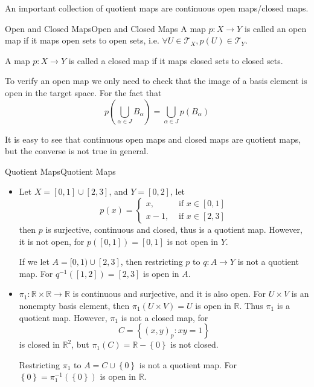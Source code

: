 \documentclass[../main.tex]{subfiles}
\begin{document}
An important collection of quotient maps are continuous open maps/closed maps.
\begin{definition}{Open and Closed Maps}{Open and Closed Maps}
A map $p: X \rightarrow Y$ is called an open map if it maps open sets to open sets, i.e. $\forall U\in \mathcal{T}_X, p(U) \in \mathcal{T}_Y$.

A map $p: X \rightarrow Y$ is called a closed map if it maps closed sets to closed sets.
\end{definition}

\begin{remark}
To verify an open map we only need to check that the image of a basis element is open in the target space. For the fact that
\begin{equation*}
p(\bigcup_{\alpha\in J} B_{\alpha}) = \bigcup_{\alpha\in J} p(B_{\alpha})
\end{equation*}
\end{remark}

It is easy to see that continuous open maps and closed maps are quotient maps, but the converse is not true in general.

\begin{example}{Quotient Maps}{Quotient Maps}
\begin{itemize}
\item Let $X = [0,1]\cup [2,3]$, and $Y = [0,2]$, let
\begin{equation*}
p(x) = 
\begin{cases}
	x, &\text{ if } x\in [0,1] \\
	x-1, &\text{ if } x\in [2,3]
\end{cases}
\end{equation*}
then $p$ is surjective, continuous and closed, thus is a quotient map. However, it is not open, for $p([0,1]) = [0,1]$ is not open in $Y$.

If we let $A = [0,1)\cup [2,3]$, then restricting $p$ to $q: A \rightarrow Y$ is not a quotient map. For $q^{-1}([1,2]) = [2,3]$ is open in $A$.
\item $\pi_1: \mathbb{R} \times \mathbb{R} \rightarrow \mathbb{R}$ is continuous and surjective, and it is also open. For $U \times V$ is an nonempty basis element, then $\pi_1(U \times V) = U$ is open in $\mathbb{R}$. Thus $\pi_1$ is a quotient map. However, $\pi_1$ is not a closed map, for
	\begin{equation*}
	C = \left\{ (x,y)_p:xy=1 \right\}
	\end{equation*}
	is closed in $\mathbb{R}^2$, but $\pi_1(C) = \mathbb{R}-\left\{ 0 \right\}$ is not closed.

	Restricting $\pi_1$ to $A = C\cup \left\{ 0 \right\}$ is not a quotient map. For $\left\{ 0 \right\} = \pi_1^{-1}(\left\{ 0 \right\})$ is open in $\mathbb{R}$.
\end{itemize}
\end{example}
\end{document}
